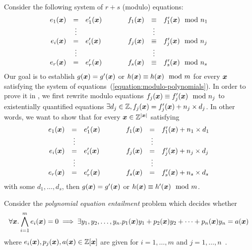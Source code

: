 Consider the following system of $r + s$ (modulo) equations:
\begin{equation}
  \label{equation:modulo-polynomials}
  \begin{array}{rclcrcl}
    e_1 (\vx) & = & e'_1 (\vx) 
    & \hspace{.05\textwidth} &
    f_1 (\vx) & \equiv & f'_1 (\vx) \mod n_1\\
    & \vdots & & & & \vdots \\
    e_i (\vx) & = & e'_i (\vx) & &
    f_j (\vx) & \equiv & f'_j (\vx) \mod n_j\\
    & \vdots & & & & \vdots \\
    e_r (\vx) & = & e'_r (\vx) & &
    f_s (\vx) & \equiv & f'_s (\vx) \mod n_s
  \end{array}
\end{equation}
Our goal is to establish $g (\vx) = g' (\vx)$ or $h (\vx)
\equiv h (\vx) \mod m$ for every $\vx$ satisfying the system
of equations~(\ref{equation:modulo-polynomials}). In order to prove it
in \coq, we first rewrite modulo equations $f_j (\vx) \equiv f'_j
(\vx) \mod n_j$ to existentially quantified equations $\exists d_j
\in \bbfZ, f_j (\vx) = f'_j (\vx) + n_j \times d_j$. In other
words, we want to show that for every $\vx \in \bbfZ^{|\vx|}$
satisfying 
\begin{equation}
  \label{equation:polynomials}
  \begin{array}{rclcrcl}
    e_1 (\vx) & = & e'_1 (\vx) 
    & \hspace{.05\textwidth} &
    f_1 (\vx) & = & f'_1 (\vx) + n_1 \times d_1 \\
    & \vdots & & & & \vdots \\
    e_i (\vx) & = & e'_i (\vx) & &
    f_j (\vx) & = & f'_j (\vx) + n_j \times d_j \\
    & \vdots & & & & \vdots \\
    e_r (\vx) & = & e'_r (\vx) & &
    f_s (\vx) & = & f'_s (\vx) + n_s \times d_s
  \end{array}
\end{equation}
with some $d_1, \ldots, d_s$, then $g (\vx) = g' (\vx)$ or $h
(\vx) \equiv h' (\vx) \mod m$. 

Consider the 
\emph{polynomial equation entailment} problem which decides whether
\[
\forall \vx. \bigwedge\limits^m_{i=1} e_i(\vx) = 0
             \implies \exists y_1, y_2, \ldots, y_n.
             p_1(\vx) y_1 + p_2(\vx) y_2 + \cdots + p_n(\vx) y_n = a(\vx)
\]
where $e_i(\vx), p_j(\vx), a(\vx) \in \bbfZ[\vx]$ are given for $i =
1, \ldots, m$ and $j = 1, \ldots, n$~\cite{H:07:AENTP}.

